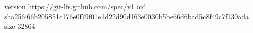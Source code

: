 version https://git-lfs.github.com/spec/v1
oid sha256:66b205851c176e0f79f01e1d22d90d163e0030b5be66d6bad5c8f49c7f130ada
size 32864
